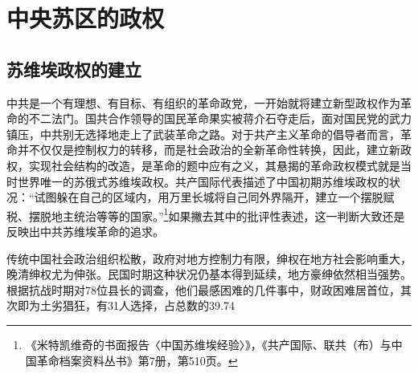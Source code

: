 \section{中央苏区的政权}

\subsection{苏维埃政权的建立}


中共是一个有理想、有目标、有组织的革命政党，一开始就将建立新型政权作为革命的不二法门。国共合作领导的国民革命果实被蒋介石夺走后，面对国民党的武力镇压，中共别无选择地走上了武装革命之路。对于共产主义革命的倡导者而言，革命并不仅仅是控制权力的转移，而是社会政治的全新革命性转换，因此，建立新政权，实现社会结构的改造，是革命的题中应有之义，其悬揭的革命政权模式就是当时世界唯一的苏俄式苏维埃政权。共产国际代表描述了中国初期苏维埃政权的状况：“试图躲在自己的区域内，用万里长城将自己同外界隔开，建立一个摆脱赋税、摆脱地主统治等等的国家。”\footnote{《米特凯维奇的书面报告〈中国苏维埃经验〉》，《共产国际、联共（布）与中国革命档案资料丛书》第7册，第510页。}如果撇去其中的批评性表述，这一判断大致还是反映出中共苏维埃革命的追求。


传统中国社会政治组织松散，政府对地方控制力有限，绅权在地方社会影响重大，晚清绅权尤为伸张。民国时期这种状况仍基本得到延续，地方豪绅依然相当强势。根据抗战时期对78位县长的调查，他们最感困难的几件事中，财政困难居首位，其次即为土劣猖狂，有31人选择，占总数的39.74%


